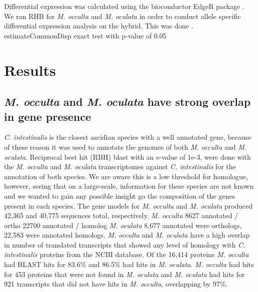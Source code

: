 Differential expression was calculated using the bioconductor EdgeR package \cite{}. We ran RHB  for \textit{M. occulta} and \textit{M. oculata} in order to conduct allele specific differential expression analysis on the hybrid. This was done .  
estimateCommonDisp  
exact test with p-value of 0.05 

\section{Results}
\subsection{\textit{M. occulta} and \textit{M. oculata} have strong overlap in gene presence}
\textit{C. intestinalis} is the closest ascidian species with a well annotated gene, because of these reason it was used to annotate the genomes of both \textit{M. occulta} and \textit{M. oculata}. Reciprocal best hit (RBH) blast with an e-value of 1e-3, were done with the \textit{M. occulta} and \textit{M. oculata} transcriptomes against \textit{C. intestinalis} for the annotation of both species.  We are aware this is a low threshold for homologue, however, seeing that on a large-scale, information for these species are not known and we wanted to gain any possible insight go the composition of the genes present in each species. The gene models for \textit{M. occulta} and \textit{M. oculata} produced 42,365 and 40,775 sequences total, respectively. \textit{M. occulta} 8627 annotated / ortho 22700 annotated / homolog \textit{M. oculata} 8,677 annotated were orthologs, 22,583 were annotated homologs. \textit{M. occulta} and \textit{M. oculata} have a high overlap in number of translated transcripts that showed any level of homology with \textit{C. intestinalis} proteins from the NCBI database. Of the 16,414  proteins \textit{M. occulta} had BLAST hits for 83.6\% and 86.5\% had hits in \textit{M. oculata}. \textit{M. occulta} had hits for 453 proteins that were not found in \textit{M. oculata} and \textit{M. oculata} had hits for 921 transcripts that did not have hits in \textit{M. occulta}, overlapping by 97\%.

